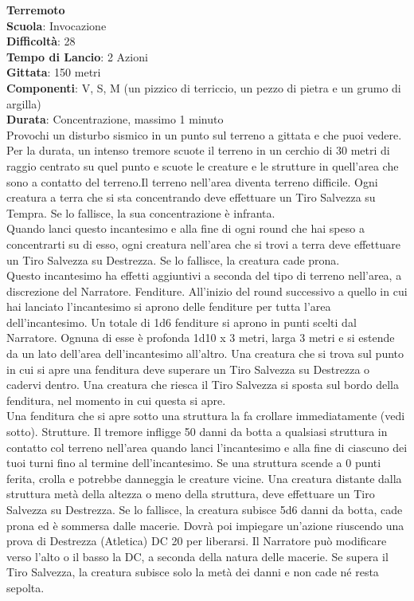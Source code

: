 \begin{multicols}{2}
\medskip\textbf{Terremoto}\\
\textbf{Scuola}: Invocazione\\
\textbf{Difficoltà}:  28\\
\textbf{Tempo di Lancio}: 2 Azioni\\
\textbf{Gittata}: 150 metri\\
\textbf{Componenti}: V, S, M (un pizzico di terriccio, un pezzo di pietra e un grumo di argilla)\\
\textbf{Durata}: Concentrazione, massimo 1 minuto\\
Provochi un disturbo sismico in un punto sul terreno a gittata e che puoi vedere. Per la durata, un intenso tremore scuote il terreno in un cerchio di 30 metri di raggio centrato su quel punto e scuote le creature e le strutture in quell'area che sono a contatto del terreno.Il terreno  nell'area diventa terreno difficile. Ogni creatura a terra che si sta concentrando deve effettuare un Tiro Salvezza su Tempra. Se lo fallisce, la sua concentrazione è infranta.\\
Quando lanci questo incantesimo e alla fine di ogni round che hai speso a concentrarti su di esso, ogni creatura nell'area che si trovi a terra deve effettuare un Tiro Salvezza su Destrezza. Se lo fallisce, la creatura cade prona.\\
Questo incantesimo ha effetti aggiuntivi a seconda del tipo di terreno nell'area, a discrezione del Narratore. Fenditure. All'inizio del round successivo a quello in cui hai lanciato l'incantesimo si aprono delle fenditure per tutta l’area dell'incantesimo. Un totale di 1d6 fenditure si aprono in punti scelti dal Narratore. Ognuna di esse è profonda 1d10 x 3 metri, larga 3 metri e si estende da un lato dell'area dell'incantesimo all'altro. Una creatura che si trova sul punto in cui si apre una fenditura deve superare un Tiro Salvezza su Destrezza o cadervi dentro. Una creatura che riesca il Tiro Salvezza si sposta sul bordo della fenditura, nel momento in cui questa si apre.\\
Una fenditura che si apre sotto una struttura la fa crollare immediatamente (vedi sotto). Strutture. Il tremore infligge 50 danni da botta a qualsiasi struttura in contatto col terreno nell'area quando lanci l'incantesimo e alla fine di ciascuno dei tuoi turni fino al termine dell'incantesimo. Se una struttura scende a 0 punti ferita, crolla e potrebbe danneggia le creature vicine. Una creatura distante dalla struttura metà della altezza o meno della struttura, deve effettuare un Tiro Salvezza su Destrezza. Se lo fallisce, la creatura subisce 5d6 danni da botta, cade prona ed è sommersa dalle macerie. Dovrà poi impiegare un'azione riuscendo una prova di Destrezza (Atletica) DC 20 per liberarsi. Il Narratore può modificare verso l’alto o il basso la DC, a seconda della natura delle macerie. Se supera il Tiro Salvezza, la creatura subisce solo la metà dei danni e non cade né resta sepolta.


\end{multicols}

